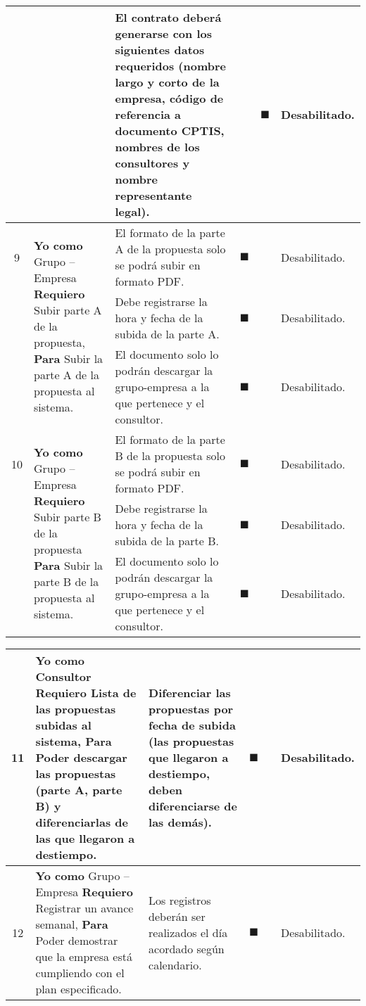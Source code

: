 \documentclass[letterpaper,11pt]{article}
\begin{document}
\begin{landscape}
\begin{tabular}{|c|p{5cm}|p{7.5cm}|c|c|p{7.5cm}|}
				& & El contrato deberá generarse con los siguientes datos requeridos (nombre largo y corto de la empresa, código de referencia a documento CPTIS, nombres de los consultores y nombre representante legal). &   & $\blacksquare$ & Desabilitado. \\ \hline
				9 & \multirow{3}{5cm}{\textbf{Yo como} Grupo – Empresa \textbf{Requiero} Subir parte A de la propuesta, \textbf{Para} Subir la parte A de la propuesta al sistema.} & El formato de la parte A de la propuesta solo se podrá subir en formato PDF. &  $\blacksquare$ & & Desabilitado. \\ \cline{3-6} 
				& & Debe registrarse la hora y fecha de la subida de la parte A. & $\blacksquare$ & & Desabilitado. \\ \cline{3-6} 
				& & El documento solo lo podrán descargar la grupo-empresa a la que pertenece y el consultor. & $\blacksquare$ & & Desabilitado. \\ \hline 
				10 & \multirow{3}{5cm}{\textbf{Yo como} Grupo – Empresa \textbf{Requiero} Subir parte B de la propuesta \textbf{Para} Subir la parte B de la propuesta al sistema.} & El formato de la parte B de la propuesta solo se podrá subir en formato PDF. &  $\blacksquare$ & & Desabilitado. \\ \cline{3-6} 
				& & Debe registrarse la hora y fecha de la subida de la parte B. & $\blacksquare$ & & Desabilitado. \\ \cline{3-6} 
				& & El documento solo lo podrán descargar la grupo-empresa a la que pertenece y el consultor. & $\blacksquare$ & & Desabilitado. \\ \hline
		\end{tabular}
		\newpage
		\begin{tabular}{|c|p{5cm}|p{7.5cm}|c|c|p{7.5cm}|}
			\hline
			11 & \textbf{Yo como} Consultor \textbf{Requiero} Lista de las propuestas subidas al sistema, \textbf{Para} Poder descargar las propuestas (parte A, parte B) y diferenciarlas de las que llegaron a destiempo. & 	Diferenciar las propuestas por fecha de subida (las propuestas que llegaron a destiempo, deben diferenciarse de las demás). &  $\blacksquare$ & & Desabilitado. \\ \hline
			12 & \multirow{4}{5cm}{\textbf{Yo como} Grupo – Empresa \textbf{Requiero} Registrar un avance semanal, 	\textbf{Para} Poder demostrar que la empresa está cumpliendo con el plan especificado.} & Los registros deberán ser realizados el día acordado
			según calendario. & $\blacksquare$ & & Desabilitado. \\ \cline{3-6} 

\end{tabular}
\end{landscape}
\end{document}
